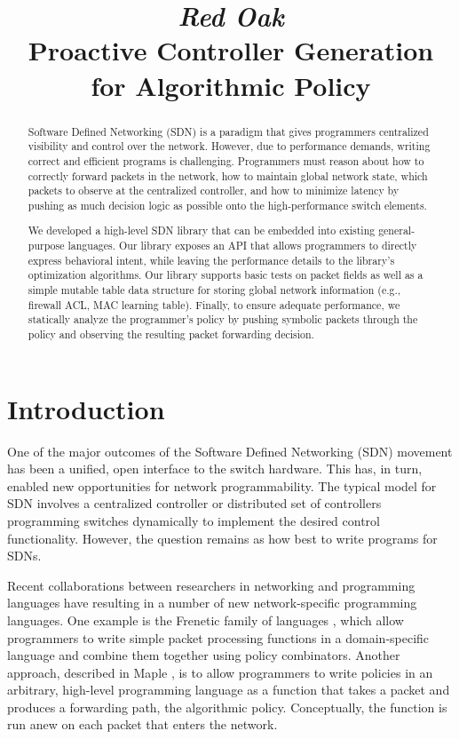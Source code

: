 \documentclass[nocopyrightspace]{sigplanconf}
\title{\textit{Red Oak}\\ Proactive Controller Generation for Algorithmic Policy}
\begin{document}
\maketitle


\begin{abstract}
Software Defined Networking (SDN) is a paradigm that gives programmers 
centralized visibility and control over the network. However, due to performance 
demands, writing correct and efficient programs is challenging. Programmers must 
reason about how to correctly forward packets in the network, how to maintain
global network state, which packets to observe at the centralized controller, 
and how to minimize latency by pushing as much decision logic
as possible onto the high-performance switch elements.

We developed a high-level SDN library that can be embedded into existing general-purpose languages.
Our library exposes an API that allows programmers to directly express behavioral intent, 
while leaving the performance details to the library's optimization algorithms.
Our library supports basic tests on packet fields as well as a simple mutable table
data structure for storing global network information (e.g., firewall ACL, MAC learning table).
Finally, to ensure adequate performance, 
we statically analyze the programmer's policy by pushing symbolic packets through the policy 
and observing the resulting packet forwarding decision.
\end{abstract}


\section*{Introduction}

One of the major outcomes of the Software Defined Networking (SDN) movement has been a unified, open interface to the switch hardware. This has, in turn, enabled new opportunities for network programmability. The typical model for SDN involves a centralized controller or distributed set of controllers programming switches dynamically to implement the desired control functionality.
However, the question remains as how best to write programs for SDNs.

Recent collaborations between researchers in networking and programming languages have resulting in a number of new network-specific programming languages. One example is the Frenetic family of languages \cite{Frenetic}, which allow programmers to write simple packet processing functions in a domain-specific language and combine them together using policy combinators. Another approach, described in Maple \cite{Maple}, is to allow programmers to write policies in an arbitrary, high-level programming language as a function that takes a packet and produces a forwarding path, the algorithmic policy. Conceptually, the function is run anew on each packet that enters the network.
\end{document}
